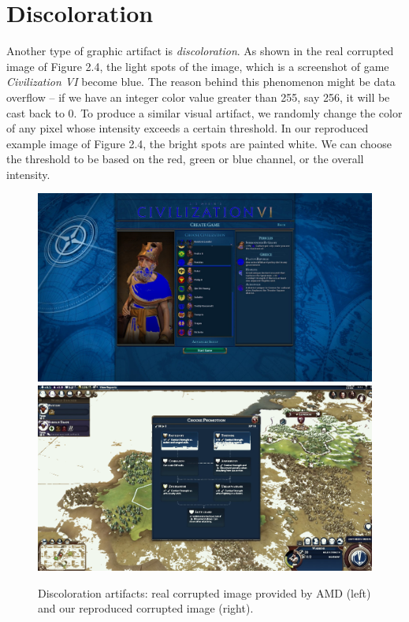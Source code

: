 \section*{Discoloration}
Another type of graphic artifact is \textit{discoloration}. As shown in the real corrupted image of Figure 2.4, the light spots of the image, which is a screenshot of game \textit{Civilization VI} become blue. The reason behind this phenomenon might be data overflow -- if we have an integer color value greater than 255, say 256, it will be cast back to 0. To produce a similar visual artifact, we randomly change the color of any pixel whose intensity exceeds a certain threshold. In our reproduced example image of Figure 2.4, the bright spots are painted white. We can choose the threshold to be based on the red, green or blue channel, or the overall intensity.

\begin{figure}[!ht]
\includegraphics[scale=0.132]{images/disco1.jpg}
\includegraphics[scale=0.152]{images/disco2.png}
\vspace{5pt}
\caption[Discoloration artifacts]{Discoloration artifacts: real corrupted image provided by AMD (left) and our reproduced corrupted image (right).}
\label{fig:discoloration}
\end{figure}

